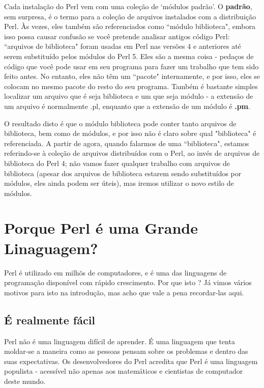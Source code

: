 \documentclass[a4paper,12pt,twoside]{book}
\begin{document}
\noindent Cada instalação do Perl vem com uma coleção de `módulos padrão'. O \textbf{padrão}, 
sem surpresa, é o termo para a cole\c{c}ão de arquivos instalados com a distribuição Perl. Às vezes, 
eles também são referenciados como ``módulo biblioteca", embora isso possa causar confusão se você 
pretende analisar antigos código Perl: ``arquivos de biblioteca" foram usadas em Perl nas versões 
4 e anteriores até serem substituído pelos módulos do Perl 5. Eles são a mesma coisa - pedaços 
de código que você pode usar em seu programa para fazer um trabalho que tem sido feito antes. 
No entanto, eles não têm um ``pacote" internamente, e por isso, eles se colocam no mesmo pacote 
do resto do seu programa. Também é bastante simples localizar um arquivo que é seja biblioteca 
e um que seja módulo - a extensão de um arquivo é normalmente .pl, enquanto que a extensão de 
um módulo é \textbf{.pm}.\medskip

\noindent O resultado disto é que o módulo biblioteca pode conter tanto arquivos de biblioteca, 
bem como de módulos, e por isso não é claro sobre qual "biblioteca" é referenciada. A partir de 
agora, quando falarmos de uma ``biblioteca", estamos referindo-se à coleção de arquivos distribuídos 
com o Perl, ao invés de arquivos de biblioteca do Perl 4; não vamos fazer qualquer trabalho com 
arquivos de biblioteca (apesar dos arquivos de biblioteca estarem sendo substituídos por módulos, 
eles ainda podem ser úteis), mas iremos utilizar o novo estilo de módulos.

\section{Porque Perl é uma Grande Linaguagem?}

\noindent Perl é utilizado em milhõs de computadores, e é uma das linguagens de programação 
disponível com rápido crescimento. Por que isto ? Já vimos vários motivos para isto na 
introdução, mas acho que vale a pena recordar-las aqui.

\subsection{É realmente fácil}

\noindent Perl não é uma linguagem difícil de aprender. É uma linguagem que tenta moldar-se 
a maneira como as pessoas pensam sobre os problemas e dentro das suas expectativas. Os 
desenvolvedores do Perl acredita que Perl é uma linguagem populista - acessível não 
apenas aos matemáticos e cientistas de computador deste mundo.\medskip
\end{document}
